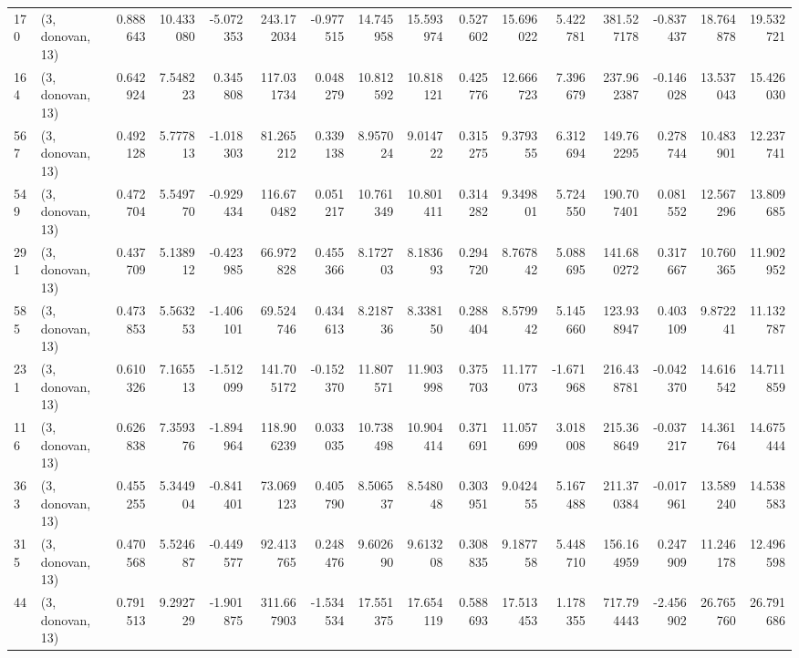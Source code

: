 \begin{tabular}{llrrrrrrrrrrrrrr}
170 &  (3, donovan, 13) &   0.888643 &  10.433080 &  -5.072353 &   243.172034 &  -0.977515 &  14.745958 &  15.593974 &  0.527602 &  15.696022 &   5.422781 &    381.527178 &  -0.837437 &   18.764878 &   19.532721 \\
164 &  (3, donovan, 13) &   0.642924 &   7.548223 &   0.345808 &   117.031734 &   0.048279 &  10.812592 &  10.818121 &  0.425776 &  12.666723 &   7.396679 &    237.962387 &  -0.146028 &   13.537043 &   15.426030 \\
567 &  (3, donovan, 13) &   0.492128 &   5.777813 &  -1.018303 &    81.265212 &   0.339138 &   8.957024 &   9.014722 &  0.315275 &   9.379355 &   6.312694 &    149.762295 &   0.278744 &   10.483901 &   12.237741 \\
549 &  (3, donovan, 13) &   0.472704 &   5.549770 &  -0.929434 &   116.670482 &   0.051217 &  10.761349 &  10.801411 &  0.314282 &   9.349801 &   5.724550 &    190.707401 &   0.081552 &   12.567296 &   13.809685 \\
291 &  (3, donovan, 13) &   0.437709 &   5.138912 &  -0.423985 &    66.972828 &   0.455366 &   8.172703 &   8.183693 &  0.294720 &   8.767842 &   5.088695 &    141.680272 &   0.317667 &   10.760365 &   11.902952 \\
585 &  (3, donovan, 13) &   0.473853 &   5.563253 &  -1.406101 &    69.524746 &   0.434613 &   8.218736 &   8.338150 &  0.288404 &   8.579942 &   5.145660 &    123.938947 &   0.403109 &    9.872241 &   11.132787 \\
231 &  (3, donovan, 13) &   0.610326 &   7.165513 &  -1.512099 &   141.705172 &  -0.152370 &  11.807571 &  11.903998 &  0.375703 &  11.177073 &  -1.671968 &    216.438781 &  -0.042370 &   14.616542 &   14.711859 \\
116 &  (3, donovan, 13) &   0.626838 &   7.359376 &  -1.894964 &   118.906239 &   0.033035 &  10.738498 &  10.904414 &  0.371691 &  11.057699 &   3.018008 &    215.368649 &  -0.037217 &   14.361764 &   14.675444 \\
363 &  (3, donovan, 13) &   0.455255 &   5.344904 &  -0.841401 &    73.069123 &   0.405790 &   8.506537 &   8.548048 &  0.303951 &   9.042455 &   5.167488 &    211.370384 &  -0.017961 &   13.589240 &   14.538583 \\
315 &  (3, donovan, 13) &   0.470568 &   5.524687 &  -0.449577 &    92.413765 &   0.248476 &   9.602690 &   9.613208 &  0.308835 &   9.187758 &   5.448710 &    156.164959 &   0.247909 &   11.246178 &   12.496598 \\
44  &  (3, donovan, 13) &   0.791513 &   9.292729 &  -1.901875 &   311.667903 &  -1.534534 &  17.551375 &  17.654119 &  0.588693 &  17.513453 &   1.178355 &    717.794443 &  -2.456902 &   26.765760 &   26.791686 \\

\end{tabular}
